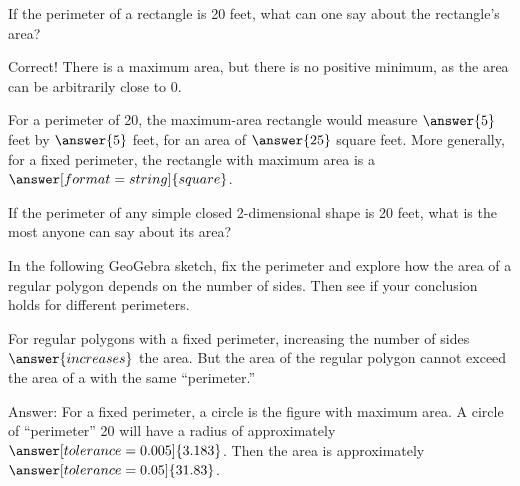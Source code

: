 \documentclass[nooutcomes]{ximera}
\begin{document}
\begin{problem}
If the perimeter of a rectangle is 20 feet, what can one say about the rectangle's area?  

\begin{selectAll}
\end{selectAll}

\begin{problem}

Correct!  There is a maximum area, but there is no positive minimum, as the area can be arbitrarily close to 0.  

For a perimeter of 20, the maximum-area rectangle would measure $\answer{5}$ feet by $\answer{5}$ feet, for an area of $\answer{25}$ square feet.  More generally, for a fixed perimeter, the rectangle with maximum area is a $\answer[format=string]{square}$.

\begin{problem}
If the perimeter of any simple closed 2-dimensional shape is 20 feet, what is the most anyone can say about its area?

In the following GeoGebra sketch, fix the perimeter and explore how the area of a regular polygon depends on the number of sides.  Then see if your conclusion holds for different perimeters.  
\begin{center}  
\end{center}
For regular polygons with a fixed perimeter, increasing the number of sides
$\answer{increases}$ the area.  But the area of the regular polygon cannot 
exceed the area of a 
with the same ``perimeter.''

\begin{problem}
Answer: For a fixed perimeter, a circle is the figure with maximum area.  A circle of ``perimeter'' 20 will have a radius of approximately $\answer[tolerance=0.005]{3.183}$. %
Then the area is approximately $\answer[tolerance=0.05]{31.83}$. %
\end{problem}
\end{problem}
\end{problem}
\end{problem}
\end{document}

